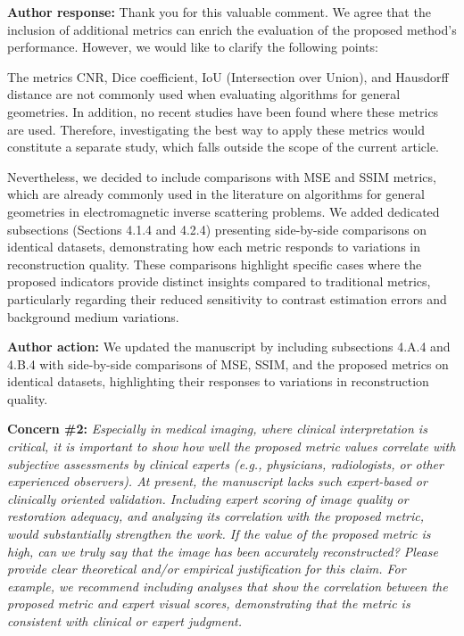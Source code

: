 \documentclass[12pt, a4paper]{article}
\newcommand{\concern}[2]{
    \noindent \textbf{Concern \##1:} \textit{#2}
    \par\vspace{0.3cm}
}
\newcommand{\response}[1]{
    \noindent \textbf{Author response:} #1
    \par\vspace{0.3cm}
}
\newcommand{\action}[1]{
    \noindent \textbf{Author action:} #1
    \par\vspace{0.5cm}
}
\begin{document}
\response{
    Thank you for this valuable comment. We agree that the inclusion of additional metrics can enrich the evaluation of the proposed method's performance. However, we would like to clarify the following points:
    
    The metrics CNR, Dice coefficient, IoU (Intersection over Union), and Hausdorff distance are not commonly used when evaluating algorithms for general geometries. In addition, no recent studies have been found where these metrics are used. Therefore, investigating the best way to apply these metrics would constitute a separate study, which falls outside the scope of the current article.
    
    Nevertheless, we decided to include comparisons with MSE and SSIM metrics, which are already commonly used in the literature on algorithms for general geometries in electromagnetic inverse scattering problems. We added dedicated subsections (Sections 4.1.4 and 4.2.4) presenting side-by-side comparisons on identical datasets, demonstrating how each metric responds to variations in reconstruction quality. These comparisons highlight specific cases where the proposed indicators provide distinct insights compared to traditional metrics, particularly regarding their reduced sensitivity to contrast estimation errors and background medium variations.
}

\action{We updated the manuscript by including subsections 4.A.4 and 4.B.4 with side-by-side comparisons of MSE, SSIM, and the proposed metrics on identical datasets, highlighting their responses to variations in reconstruction quality.}

\concern{2}{Especially in medical imaging, where clinical interpretation is critical, it is important to show how well the proposed metric values correlate with subjective assessments by clinical experts (e.g., physicians, radiologists, or other experienced observers). At present, the manuscript lacks such expert-based or clinically oriented validation. Including expert scoring of image quality or restoration adequacy, and analyzing its correlation with the proposed metric, would substantially strengthen the work. If the value of the proposed metric is high, can we truly say that the image has been accurately reconstructed? Please provide clear theoretical and/or empirical justification for this claim. For example, we recommend including analyses that show the correlation between the proposed metric and expert visual scores, demonstrating that the metric is consistent with clinical or expert judgment.}
\end{document}
